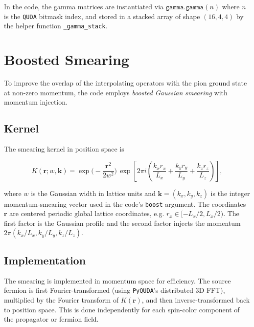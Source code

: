 \documentclass[11pt,a4paper]{article}
\newcommand{\pyquda}{\texttt{PyQUDA}}
\newcommand{\quda}{\texttt{QUDA}}
\begin{document}
In the code, the gamma matrices are instantiated via \(\texttt{gamma.gamma}(n)\)
where \(n\) is the \quda{} bitmask index, and stored in a stacked array of shape
\((16, 4, 4)\) by the helper function \texttt{\_gamma\_stack}.


\section{Boosted Smearing}
\label{sec:boosted_smearing}

To improve the overlap of the interpolating operators with the pion ground state
at non-zero momentum, the code employs \emph{boosted Gaussian smearing} with
momentum injection.

\subsection{Kernel}

The smearing kernel in position space is

\begin{equation}
K(\mathbf{r}; w, \mathbf{k})
  = \exp\!\Big(-\frac{\mathbf{r}^2}{2w^2}\Big) \,
    \exp\!\left[
      2\pi i
      \left(
        \frac{k_x r_x}{L_x}
        + \frac{k_y r_y}{L_y}
        + \frac{k_z r_z}{L_z}
      \right)
    \right] ,
\label{eq:kernel}
\end{equation}

where \(w\) is the Gaussian width in lattice units and
\(\mathbf{k}=(k_x,k_y,k_z)\) is the integer momentum-smearing vector used in the
code's \texttt{boost} argument.  The coordinates \(\mathbf{r}\) are centered
periodic global lattice coordinates, e.g. \(r_x\in[-L_x/2,L_x/2)\).  The first
factor is the Gaussian profile and the second factor injects the momentum
\(2\pi(k_x/L_x,k_y/L_y,k_z/L_z)\).

\subsection{Implementation}

The smearing is implemented in momentum space for efficiency.  The source
fermion is first Fourier-transformed (using \pyquda's distributed 3D FFT),
multiplied by the Fourier transform of \(K(\mathbf{r})\), and then
inverse-transformed back to position space.  This is done independently for each
spin-color component of the propagator or fermion field.
\end{document}
